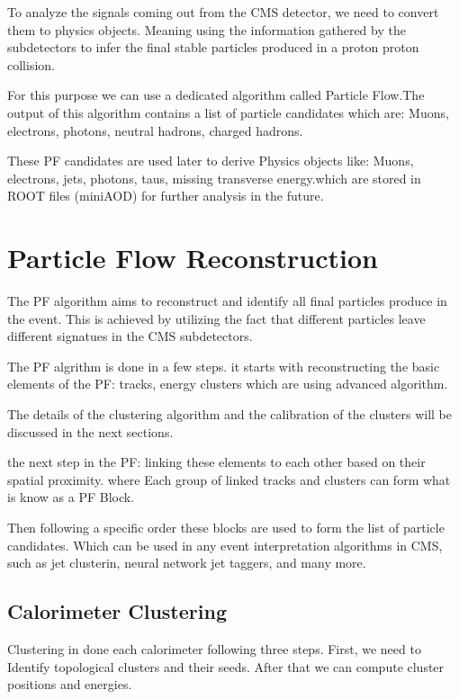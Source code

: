 
To analyze the signals coming out from the CMS detector, we need to convert them to physics objects. Meaning using the information gathered by the subdetectors to infer the final stable particles produced in a proton proton collision.

For this purpose we can use a dedicated algorithm called Particle Flow.The output of this algorithm contains a list of particle candidates which are: Muons, electrons, photons, neutral hadrons, charged hadrons.

These PF candidates are used later to derive Physics objects like: Muons, electrons, jets, photons, taus,  missing transverse energy.which are stored in ROOT files (miniAOD) for further analysis in the future.


\section{Particle Flow Reconstruction}

The PF algorithm aims to reconstruct and identify all final particles produce in the event.
This is achieved  by utilizing the fact that different particles leave different signatues in the CMS subdetectors.

The PF algrithm is done in a few steps.
it starts with reconstructing the basic elements of the PF: tracks, energy clusters which are using advanced algorithm.

The details of the clustering algorithm and the calibration of the clusters will be discussed in the next sections.

the next step in the PF: linking these elements to each other based on their spatial proximity.
where Each group of linked tracks and clusters can form what is know as a PF Block.

Then following a specific order these blocks are used to form the list of particle candidates.
Which can be used in any event interpretation algorithms in CMS, such as jet clusterin, neural network jet taggers, and  many more.

\subsection{Calorimeter Clustering}

Clustering in done each calorimeter following three steps. First, we need to Identify topological clusters and their seeds. After that we can compute cluster positions and energies.

